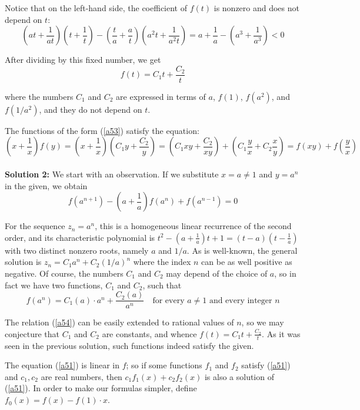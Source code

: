 \documentclass[a4paper, 12pt]{article}
\begin{document}
\begin{enumerate}
Notice that on the left-hand side, the coefficient of $f(t)$ is nonzero and does not depend on $t$:
\begin{equation*}
    \left(at + \frac{1}{at} \right) \left(t + \frac{1}{t} \right) - \left(\frac{t}{a} + \frac{a}{t} \right) \left(a^2t + \frac{1}{a^2 t} \right) = a + \frac{1}{a} - \left(a^3 + \frac{1}{a^3} \right) < 0
\end{equation*}

After dividing by this fixed number, we get
\begin{equation} \label{a53}
    f(t) = C_1 t + \frac{C_2}{t} 
\end{equation}

where the numbers $C_1$ and $C_2$ are expressed in terms of $a$, $f(1)$, $f(a^2)$, and $f(1/a^2)$, and they do not depend on $t$.

The functions of the form (\ref{a53}) satisfy the equation:
$$
\left( x + \frac{1}{x} \right) f(y) = \left( x + \frac{1}{x} \right) \left( C_1 y + \frac{C_2}{y} \right) = \left( C_1 xy + \frac{C_2}{xy} \right) + \left(C_1 \frac{y}{x} + C_2 \frac{x}{y} \right) = f(xy) + f\left( \frac{y}{x} \right)
$$ \\


\textbf{Solution 2:}  We start with an observation.  If we substitute $x = a \not = 1$ and $y = a^n$ in the given, we obtain
$$
f(a^{n+1}) - \left(a + \frac{1}{a} \right)  f(a^n) + f(a^{n-1}) = 0
$$

For the sequence $z_n = a^n$, this is a homogeneous linear recurrence of the second order, and its characteristic polynomial is $t^2 - (a + \frac{1}{a})t + 1 = (t-a)(t - \frac{1}{a})$ with two distinct nonzero roots, namely $a$ and $1/a$. As is well-known, the general solution is $z_n = C_1 a^n + C_2 (1/a)^n$ where the index $n$ can be as well positive as negative. Of course, the numbers $C_1$ and $C_2$ may depend of the choice of $a$, so in fact we have two functions, $C_1$ and $C_2$, such that
\begin{equation} \label{a54}
    f(a^n) = C_1(a) \cdot a^n + \frac{C_2(a)}{a^n} \quad \textrm{for every $a \not = 1$ and every integer $n$}
\end{equation}

The relation (\ref{a54}) can be easily extended to rational values of $n$, so we may conjecture that $C_1$ and $C_2$ are constants, and whence $f(t) = C_1 t + \frac{C_2}{t}$.  As it was seen in the previous solution, such functions indeed satisfy the given.

The equation (\ref{a51}) is linear in $f$; so if some functions $f_1$ and $f_2$ satisfy (\ref{a51}) and $c_1, c_2$ are real numbers, then $c_1 f_1(x) + c_2 f_2(x)$ is also a solution of (\ref{a51}). In order to make our formulas simpler, define
$ f_0(x) = f(x) - f(1) \cdot x$.


\end{enumerate}
\end{document}
